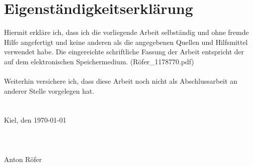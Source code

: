 \section*{Eigenständigkeitserklärung}

Hiermit erkläre ich, dass ich die vorliegende Arbeit selbständig und ohne fremde Hilfe 
angefertigt und keine anderen als die angegebenen Quellen und Hilfsmittel verwendet 
habe. Die eingereichte schriftliche Fassung der Arbeit entspricht der auf dem elektronischen Speichermedium. (Röfer\_1178770.pdf) \\
\\
Weiterhin versichere ich, dass diese Arbeit noch nicht als Abschlussarbeit an anderer 
Stelle vorgelegen hat. \\
\\
\\
Kiel, den \today\\
\\
\\
\\
Anton Röfer